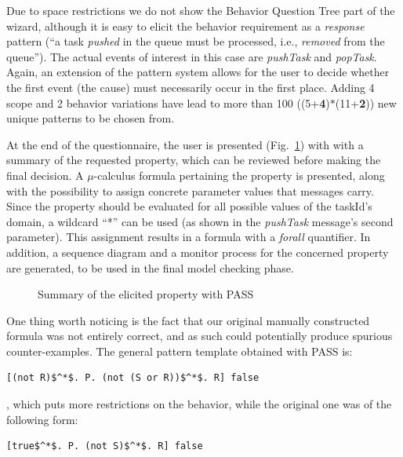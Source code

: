 \documentclass[letter]{llncs}
\begin{document}
Due to space restrictions we do not show the Behavior Question Tree part of the wizard, although it is easy to
elicit the behavior requirement as a \emph{response} pattern (``a task \emph{pushed} in the queue must be processed, i.e., \emph{removed} from the queue'').
The actual events of interest in this case are \emph{pushTask} and \emph{popTask}. Again, an extension of the pattern system allows
for the user to decide whether the first event (the cause) must necessarily occur in the first place. 
Adding 4 scope and 2 behavior variations have lead to more than 100 ((5+\textbf{4})$\ast$(11+\textbf{2})) new unique patterns to be chosen from. 

At the end of the questionnaire, the user is presented (Fig.~\ref{fig:Summary}) with with a summary of the requested property, which can be reviewed before making the final decision.
A $\mu$-calculus formula pertaining the property is presented, along with the possibility to assign concrete parameter values that messages carry. 
Since the property should be evaluated for all possible values of the taskId's domain, a wildcard ``*'' can be used (as shown in the \emph{pushTask} message's second parameter).
This assignment results in a formula with a \emph{forall} quantifier. In addition, a sequence diagram and a monitor process for the concerned property 
are generated, to be used in the final model checking phase.
\begin{figure}[!t]
\centering
{%
\setlength{\fboxsep}{1.5pt}%
\setlength{\fboxrule}{0.5pt}%
%
}%
\caption{Summary of the elicited property with PASS}
\label{fig:Summary}
\end{figure}
One thing worth noticing is the fact that our original manually constructed formula was not entirely correct, and as such could potentially produce spurious counter-examples. 
The general pattern template obtained with PASS is:
\begin{lstlisting}[basicstyle=\sffamily\fontsize{7}{7}\selectfont,showspaces=false,showstringspaces=false,showtabs=false,mathescape]
[(not R)$^*$. P. (not (S or R))$^*$. R] false
\end{lstlisting} 
, which puts more restrictions on the behavior, while the original one was of the following form:
\begin{lstlisting}[basicstyle=\sffamily\fontsize{7}{7}\selectfont,showspaces=false,showstringspaces=false,showtabs=false,mathescape]
[true$^*$. P. (not S)$^*$. R] false
\end{lstlisting} 
\end{document}
